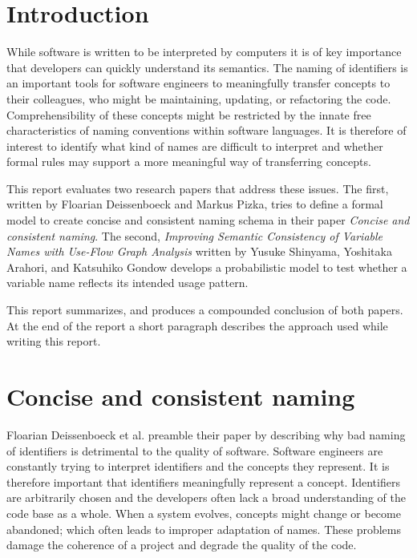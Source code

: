 \documentclass[a4paper,12pt]{article}
\begin{document}
\sectionfont{\centering\MakeUppercase}
\begin{multicols}{2}
    \linenumbers

    \section*{Introduction}
    While software is written to be interpreted by computers it is of key importance that developers can quickly
    understand
    its semantics. The naming of identifiers is an important tools for software engineers to meaningfully transfer
    concepts
    to their colleagues, who might be maintaining, updating, or refactoring the code. Comprehensibility of these
    concepts
    might be restricted by the innate free characteristics of naming conventions within software languages. It is
    therefore
    of interest to identify what kind of names are difficult to interpret and whether formal rules may support a more
    meaningful way of transferring concepts.

    This report evaluates two research papers that address these issues. The first, written by Floarian Deissenboeck
    and
    Markus Pizka, tries to define a formal model to create concise and consistent naming schema in their paper
    \textit{Concise and consistent naming}.\cite{deisenbock_concise_2005} The second, \textit{Improving Semantic
        Consistency of Variable Names with Use-Flow Graph Analysis} written by Yusuke Shinyama, Yoshitaka Arahori, and
    Katsuhiko Gondow develops a probabilistic model to test whether a variable name reflects its intended usage
    pattern.\cite{shinyama_improving_2021}

    This report summarizes, and produces a compounded conclusion of both papers. At the end of the report a short
    paragraph
    describes the approach used while writing this report.

    \section*{Concise and consistent naming}
    Floarian Deissenboeck et al. preamble their paper by describing why bad naming of identifiers is detrimental to the
    quality of software.\cite{deisenbock_concise_2005} Software engineers are constantly trying to interpret
    identifiers
    and
    the concepts they represent. It is therefore important that identifiers meaningfully represent a concept.
    Identifiers
    are arbitrarily chosen and the developers often lack a broad understanding of the code base as a whole. When a
    system
    evolves, concepts might change or become abandoned; which often leads to improper adaptation of names. These
    problems
    damage the coherence of a project and degrade the quality of the code.


\end{multicols}
\end{document}
